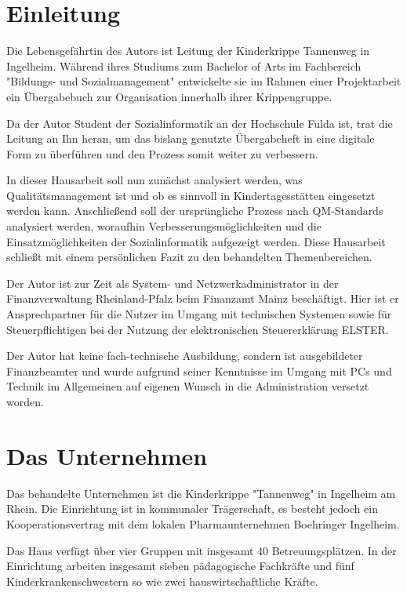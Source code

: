 \section{Einleitung}\label{Einleitung}
Die Lebensgefährtin des Autors ist Leitung der Kinderkrippe Tannenweg in Ingelheim. Während ihres Studiums zum Bachelor of Arts im Fachbereich "{}Bildungs- und Sozialmanagement"{} entwickelte sie im Rahmen einer Projektarbeit ein Übergabebuch zur Organisation innerhalb ihrer Krippengruppe. 

Da der Autor Student der Sozialinformatik an der Hochschule Fulda ist, trat die Leitung an Ihn heran, um das bislang genutzte Übergabeheft in eine digitale Form zu überführen und den Prozess somit weiter zu verbessern.

In dieser Hausarbeit soll nun zunächst analysiert werden, was  Qualitätsmanagement ist und ob es sinnvoll in Kindertagesstätten eingesetzt werden kann. Anschließend soll der ursprüngliche Prozess nach QM-Standards analysiert werden, woraufhin Verbesserungsmöglichkeiten und die Einsatzmöglichkeiten der Sozialinformatik aufgezeigt werden. Diese Hausarbeit schließt mit einem persönlichen Fazit zu den behandelten Themenbereichen.

Der Autor ist zur Zeit als System- und Netzwerkadministrator in der Finanzverwaltung Rheinland-Pfalz beim Finanzamt Mainz beschäftigt. Hier ist er Ansprechpartner für die Nutzer im Umgang mit technischen Systemen sowie für Steuerpflichtigen bei der Nutzung der elektronischen Steuererklärung ELSTER. 

Der Autor hat keine fach-technische Ausbildung, sondern ist ausgebildeter Finanzbeamter und wurde aufgrund seiner Kenntnisse im Umgang mit PCs und Technik im Allgemeinen auf eigenen Wunsch in die Administration versetzt worden.

\newpage

\section{Das Unternehmen}

Das behandelte Unternehmen ist die Kinderkrippe "{}Tannenweg"{} in Ingelheim am Rhein. Die Einrichtung ist in kommunaler Trägerschaft, es besteht jedoch ein Kooperationsvertrag mit dem lokalen Pharmaunternehmen Boehringer Ingelheim.

Das Haus verfügt über vier Gruppen mit insgesamt 40 Betreuungsplätzen. In der Einrichtung arbeiten insgesamt sieben pädagogische Fachkräfte und fünf Kinderkrankenschwestern so wie zwei hauswirtschaftliche Kräfte.

